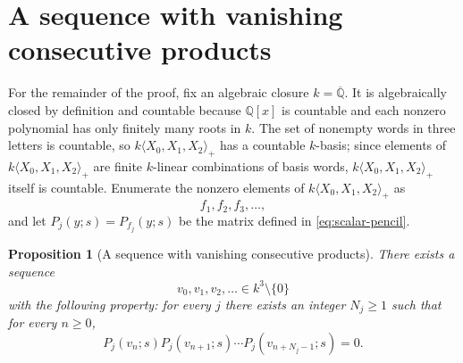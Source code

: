\documentclass[11pt]{article}
\newtheorem{proposition}[theorem]{Proposition}
\newcommand{\Free}{k\langle X_0,X_1,X_2\rangle_+}
\begin{document}
\section{A sequence with vanishing consecutive products}\label{sec:diagonal}

For the remainder of the proof, fix an algebraic closure $k=\overline{\mathbb Q}$.  It is algebraically closed by definition and countable because $\mathbb Q[x]$ is countable and each nonzero polynomial has only finitely many roots in $k$.  The set of nonempty words in three letters is countable, so $\Free$ has a countable $k$-basis; since elements of $\Free$ are finite $k$-linear combinations of basis words, $\Free$ itself is countable.  Enumerate the nonzero elements of $\Free$ as
\[
f_1,f_2,f_3,\ldots,
\]
and let $P_j(y;s)=P_{f_j}(y;s)$ be the matrix defined in \eqref{eq:scalar-pencil}.

\begin{proposition}[A sequence with vanishing consecutive products]\label{prop:sequence}
There exists a sequence
\[
v_0,v_1,v_2,\ldots\in k^3\setminus\{0\}
\]
with the following property: for every $j$ there exists an integer $N_j\ge1$ such that for every $n\ge0$,
\begin{equation}\label{eq:uniform-window}
P_j(v_n;s)P_j(v_{n+1};s)\cdots P_j(v_{n+N_j-1};s)=0.
\end{equation}
\end{proposition}
\end{document}
